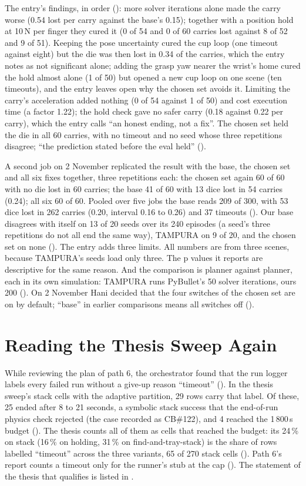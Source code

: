 The entry's findings, in order (): more solver iterations alone made the
carry worse (0.54 lost per carry against the base's 0.15); together with a position
hold at 10\,N per finger they cured it (0 of 54 and 0 of 60 carries lost against 8
of 52 and 9 of 51). Keeping the pose uncertainty cured the cup loop (one timeout
against eight) but the die was then lost in 0.34 of the carries, which the entry
notes as not significant alone; adding the grasp yaw nearer the wrist's home cured
the hold almost alone (1 of 50) but opened a new cup loop on one scene (ten
timeouts), and the entry leaves open why the chosen set avoids it. Limiting the carry's acceleration added nothing (0 of 54 against 1
of 50) and cost execution time (a factor 1.22); the hold check gave no safer carry
(0.18 against 0.22 per carry), which the entry calls ``an honest ending, not a
fix''. The chosen set held the die in all 60 carries, with no timeout and no seed
whose three repetitions disagree; ``the prediction stated before the eval held''
().

A second job on 2 November replicated the result with the base, the chosen set
and all six fixes together, three repetitions each: the chosen set again 60 of 60
with no die lost in 60 carries; the base 41 of 60 with 13 dice lost in 54 carries
(0.24); all six 60 of 60. Pooled over five jobs the base reads 209 of 300, with 53
dice lost in 262 carries (0.20, interval 0.16 to 0.26) and 37 timeouts ().
Our base disagrees with itself on 13 of 20 seeds over its 240 episodes (a seed's
three repetitions do not all end the same way), TAMPURA on 9 of 20, and the chosen
set on none (). The entry adds three limits. All numbers are from three
scenes, because TAMPURA's seeds load only three. The p values it reports are
descriptive for the same reason. And the comparison is planner against planner,
each in its own simulation: TAMPURA runs PyBullet's 50 solver iterations, ours 200
(). On 2 November Hani decided that the four switches of the chosen set are
on by default; ``base'' in earlier comparisons means all switches off ().

\section{Reading the Thesis Sweep Again}
\label{sec:timeout-reading}

While reviewing the plan of path 6, the orchestrator found that the run logger
labels every failed run without a give-up reason ``timeout'' (). In the
thesis sweep's stack cells with the adaptive partition, 29 rows carry that label.
Of these, 25 ended after 8 to 21 seconds, a symbolic stack success that the
end-of-run physics check rejected (the case recorded as CB\#122), and 4 reached
the 1\,800\,s budget (). The thesis counts all of them as cells that reached
the budget: its 24\,\% on stack (16\,\% on holding, 31\,\% on find-and-tray-stack)
is the share of rows labelled ``timeout'' across the three variants, 65 of 270
stack cells (). Path 6's report counts a timeout only for the runner's
stub at the cap (). The statement of the thesis that qualifies is listed in
.

